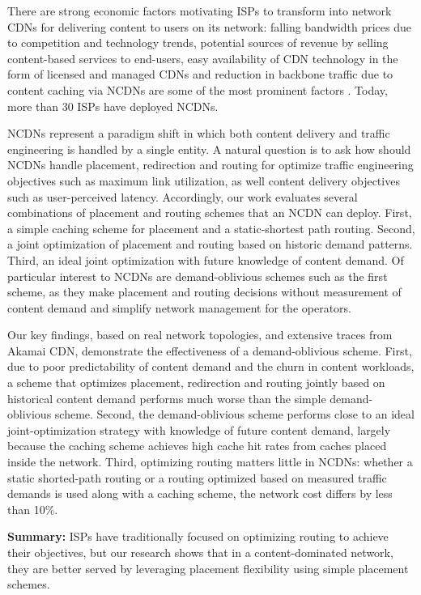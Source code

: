 There are strong economic factors motivating ISPs to transform into network CDNs for delivering content to users on its network: falling bandwidth prices due to competition and technology trends, potential sources of revenue by selling content-based services to end-users, easy availability of CDN technology in the form of licensed and managed CDNs and reduction in backbone traffic due to content caching via NCDNs are some of the most prominent factors \cite{telco-cdn-arguments}. Today, more than 30 ISPs have deployed NCDNs. 

NCDNs represent a paradigm shift in which both content delivery and traffic engineering is handled by a single entity. 
A natural question is to ask how should NCDNs handle placement, redirection and routing for optimize traffic engineering objectives such as maximum link utilization, as well content delivery objectives such as user-perceived latency. Accordingly, our work evaluates several combinations of placement and routing schemes that an NCDN can deploy. First, a simple caching scheme for placement and a static-shortest path routing. Second, a joint optimization of placement and routing based on historic demand patterns. Third,  an ideal joint optimization with future knowledge of content demand.  Of particular interest to NCDNs are demand-oblivious schemes such as the first scheme, as they make placement and routing decisions without measurement of content demand and simplify network management for the operators.

Our key findings, based on real network topologies, and extensive traces from Akamai CDN, demonstrate the effectiveness of a demand-oblivious scheme. First, due to poor predictability of content demand and the churn in content workloads, a scheme that optimizes placement, redirection and routing jointly based on historical content demand performs much worse than the simple demand-oblivious scheme. Second, the demand-oblivious scheme performs close to an ideal joint-optimization strategy with knowledge of future content demand, largely because the caching scheme achieves high cache hit rates from caches placed inside the network.  Third, optimizing routing matters little in NCDNs: whether a static shorted-path routing or a routing optimized based on measured traffic demands is used along with a caching scheme, the network cost differs by less than 10\%. 


\textbf{Summary:} ISPs have traditionally focused on optimizing routing to achieve their objectives, but our research shows that in a content-dominated network, they are better served by leveraging placement flexibility using simple placement schemes.


